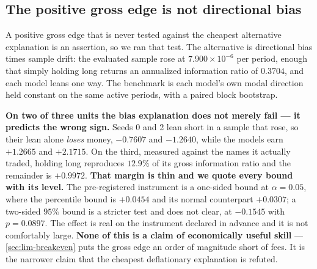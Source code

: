 \subsection{The positive gross edge is not directional bias}
\label{sec:lim-skill}

A positive gross edge that is never tested against the cheapest alternative explanation is an
assertion, so we ran that test. The alternative is directional bias times sample drift: the
evaluated sample rose at $7.900\times10^{-6}$ per period, enough that simply holding long returns
an annualized information ratio of $0.3704$, and each model leans one way. The benchmark is each
model's own modal direction held constant on the same active periods, with a paired block
bootstrap.

\textbf{On two of three units the bias explanation does not merely fail --- it predicts the wrong
sign.} Seeds 0 and 2 lean short in a sample that rose, so their lean alone \emph{loses} money,
$-0.7607$ and $-1.2640$, while the models earn $+1.2665$ and $+2.1715$. On the third, measured
against the names it actually traded, holding long reproduces $12.9\%$ of its gross information
ratio and the remainder is $+0.9972$. \textbf{That margin is thin and we quote every bound with its
level.} The pre-registered instrument is a one-sided bound at $\alpha = 0.05$, where the percentile
bound is $+0.0454$ and its normal counterpart $+0.0307$; a two-sided $95\%$ bound is a stricter
test and does not clear, at $-0.1545$ with $p = 0.0897$. The effect is real on the instrument
declared in advance and it is not comfortably large. \textbf{None of this is a claim of
economically useful skill} --- \cref{sec:lim-breakeven} puts the gross edge an order of magnitude
short of fees. It is the narrower claim that the cheapest deflationary explanation is refuted.

